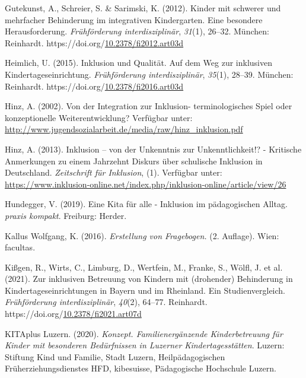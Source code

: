 \documentclass[
  ngerman,
  11pt,
  paper=a4,
  twoside,
  titlepage=true,
  openright,
  abstract=on,
  toc=listofnumbered,
  numbers=noenddot,
  chapterprefix=true,
  headings=optiontohead,
  svgnames,
  dvipsnames]{scrreprt}
\newlength{\cslhangindent}
\newlength{\cslentryspacingunit} %
\newenvironment{CSLReferences}[2] %
 {%
  \setlength{\parindent}{0pt}
  \ifodd #1
  \let\oldpar\par
  \def\par{\hangindent=\cslhangindent\oldpar}
  \fi
  \setlength{\parskip}{#2\cslentryspacingunit}
 }%
 {}
\begin{document}
\begin{CSLReferences}{1}{0}
\leavevmode{}%
Gutekunst, A., Schreier, S. \& Sarimski, K. (2012). Kinder mit schwerer
und mehrfacher Behinderung im integrativen Kindergarten. Eine besondere
Herausforderung. \emph{Frühförderung interdisziplinär}, \emph{31}(1),
26–32. München: Reinhardt.
https://doi.org/\href{https://doi.org/10.2378/fi2012.art03d}{10.2378/fi2012.art03d}

\leavevmode{}%
Heimlich, U. (2015). Inklusion und Qualität. Auf dem Weg zur inklusiven
Kindertageseinrichtung. \emph{Frühförderung interdisziplinär},
\emph{35}(1), 28–39. München: Reinhardt.
https://doi.org/\href{https://doi.org/10.2378/fi2016.art03d}{10.2378/fi2016.art03d}

\leavevmode{}%
Hinz, A. (2002). Von der Integration zur Inklusion- terminologisches
Spiel oder konzeptionelle Weiterentwicklung? Verfügbar unter:
\url{http://www.jugendsozialarbeit.de/media/raw/hinz_inklusion.pdf}

\leavevmode{}%
Hinz, A. (2013). Inklusion – von der Unkenntnis zur Unkenntlichkeit!? -
Kritische Anmerkungen zu einem Jahrzehnt Diskurs über schulische
Inklusion in Deutschland. \emph{Zeitschrift für Inklusion}, (1).
Verfügbar unter:
\url{https://www.inklusion-online.net/index.php/inklusion-online/article/view/26}

\leavevmode{}%
Hundegger, V. (2019). Eine Kita für alle - Inklusion im pädagogischen
Alltag. \emph{praxis kompakt}. Freiburg: Herder.

\leavevmode{}%
Kallus Wolfgang, K. (2016). \emph{Erstellung von Fragebogen.} (2.
Auflage). Wien: facultas.

\leavevmode{}%
Kißgen, R., Wirts, C., Limburg, D., Wertfein, M., Franke, S., Wölfl, J.
et al. (2021). Zur inklusiven Betreuung von Kindern mit (drohender)
Behinderung in Kindertageseinrichtungen in Bayern und im Rheinland. Ein
Studienvergleich. \emph{Frühförderung interdisziplinär}, \emph{40}(2),
64–77. Reinhardt.
https://doi.org/\href{https://doi.org/10.2378/fi2021.art07d}{10.2378/fi2021.art07d}

\leavevmode{}%
KITAplus Luzern. (2020). \emph{Konzept. Familienergänzende
Kinderbetreuung f{ü}r Kinder mit besonderen Bed{ü}rfnissen in Luzerner
Kindertagesst{ä}tten}. Luzern: Stiftung Kind und Familie, Stadt Luzern,
Heilpädagogischen Früherziehungsdienstes HFD, kibesuisse, Pädagogische
Hochschule Luzern.


\end{CSLReferences}
\end{document}
